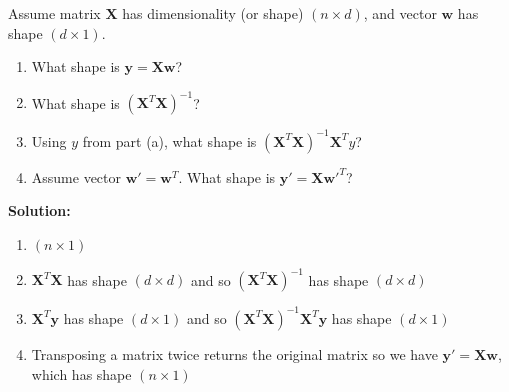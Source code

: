 \documentclass{harvardml}
\theoremstyle{definition}
\theoremstyle{plain}
\begin{document}
\begin{problem}
Assume matrix $\mathbf{X}$ has dimensionality (or shape) $(n \times d)$, and vector $\mathbf{w}$ has shape $(d \times 1)$.

\begin{enumerate}[label=(\alph*)]
		        
		        \item What shape is $\mathbf{y} =  \mathbf{X} \mathbf{w}$?
		        
		        \item What shape is $(\mathbf{X}^T \mathbf{X})^{-1}$?
		        
		        \item Using $y$ from part (a), what shape is $(\mathbf{X}^T \mathbf{X})^{-1} \mathbf{X}^T y$?
		        
		        \item Assume vector $\mathbf{w}' = \mathbf{w}^T$.  What shape is $\mathbf{y}' = \mathbf{X}\mathbf{w}'^T $?  

		    \end{enumerate}

\noindent \textbf{Solution:}
\begin{enumerate}[label=(\alph*)]
    \item $(n \times 1)$
    \item $\mathbf{X}^T\mathbf{X}$ has shape $(d \times d)$ and so $(\mathbf{X}^T\mathbf{X})^{-1}$ has shape $(d \times d)$
    \item $\mathbf{X}^T \mathbf{y}$ has shape $(d \times 1)$ and so $(\mathbf{X}^T\mathbf{X})^{-1}\mathbf{X}^T \mathbf{y}$ has shape $(d \times 1)$
    \item Transposing a matrix twice returns the original matrix so we have $\mathbf{y}' = \mathbf X \mathbf{w}$, which has shape $(n  \times 1)$
\end{enumerate}
\end{problem}
\end{document}
